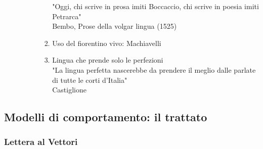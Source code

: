 \documentclass{article}
\begin{document}
\begin{enumerate}
\begin{enumerate}
\begin{enumerate}
\begin{enumerate}
                                "Oggi, chi scrive in prosa imiti Boccaccio, chi scrive in poesia imiti Petrarca" \\
                                Bembo, Prose della volgar lingua (1525)
                            \item Uso del fiorentino vivo: Machiavelli
                            \item Lingua che prende solo le perfezioni \\
                                "La lingua perfetta nascerebbe da prendere il meglio dalle parlate di tutte le corti d'Italia" \\
                                Castiglione
                        \end{enumerate}
                \end{enumerate}
        \end{enumerate}
\end{enumerate}

\newpage
\subsection{Modelli di comportamento: il trattato}
\subsubsection{Lettera al Vettori}
\end{document}
